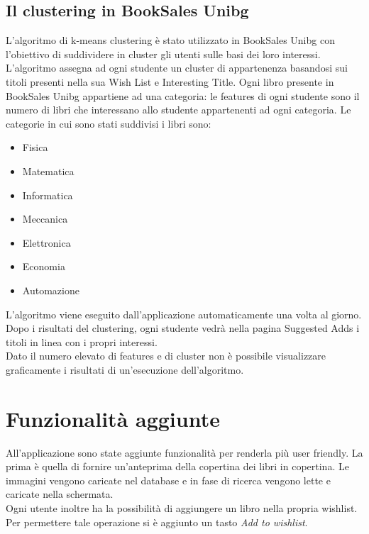 \documentclass[10pt,a4paper]{article}
\begin{document}
		\subsection{Il clustering in BookSales Unibg}
		L'algoritmo di k-means clustering è stato utilizzato in BookSales Unibg con l'obiettivo di suddividere in cluster gli utenti sulle basi dei loro interessi.
		L'algoritmo assegna ad ogni studente un cluster di appartenenza basandosi sui titoli presenti nella sua Wish List e Interesting Title. Ogni libro 
		presente in BookSales Unibg appartiene ad una categoria: le features di ogni studente sono il numero di libri che interessano allo studente 
		appartenenti ad ogni categoria.
		Le categorie in cui sono stati suddivisi i libri sono:
		\begin{itemize}
			\item Fisica
			\item Matematica
			\item Informatica
			\item Meccanica
			\item Elettronica
			\item Economia
			\item Automazione
		\end{itemize}
		L'algoritmo viene eseguito dall'applicazione automaticamente una volta al giorno.
		Dopo i risultati del clustering, ogni studente vedrà nella pagina Suggested Adds i titoli in linea con i propri interessi.\\
		Dato il numero elevato di features e di cluster non è possibile visualizzare graficamente i risultati di un'esecuzione dell'algoritmo.

\section{Funzionalità aggiunte}
All'applicazione sono state aggiunte funzionalità per renderla più user friendly. La prima è quella di fornire un'anteprima della copertina dei libri in copertina. Le immagini vengono caricate nel database e in fase di ricerca vengono lette e caricate nella schermata.\\
Ogni utente inoltre ha la possibilità di aggiungere un libro nella propria wishlist. Per permettere tale operazione si è aggiunto un tasto \textit{Add to wishlist}.
\end{document}
